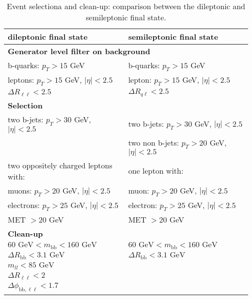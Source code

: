 \documentclass[10pt,a4paper]{article}
\newcommand{\levels}[1]{ \multicolumn{2}{l}{\hspace{-1em}\textbf{#1}}}
\newcommand{\T}{\rule{0pt}{2.9ex}}       %
\newcommand{\lnu}{$\ell\nu$}
\renewcommand{\ll}{\ell\ell}
\newcommand{\bb}{\text{bb}}
\begin{document}
\begin{table}[p]
	\centering
	\caption{Event selectiona and clean-up: comparison between the dileptonic and semileptonic final state.} \vspace{5pt}
	\label{cuts}
	\begin{tabular}{@{\quad}ll@{}}
	\toprule
	dileptonic final state                     &   semileptonic final state   \\
	\midrule
	\levels{Generator level filter on background} \T\\
	b-quarks: $p_T > 15$ GeV                      & b-quarks: $p_T > 15$ GeV    \\
	leptons: $p_T > 15$ GeV, $|\eta| < 2.5$       & lepton: $p_T > 15$ GeV, $|\eta| < 2.5$    \\
	$\Delta R_{\ll} < 2.5$                        & $\Delta R_{q\ell} < 2.5$ \\
	\levels{Selection} \T\\
	two b-jets: $p_T > 30$ GeV, $|\eta|<2.5$      & two b-jets: $p_T > 30$ GeV, $|\eta|<2.5$ \\
	                                              & two non b-jets: $p_T > 20$ GeV, $|\eta|<2.5$ \\
	two oppositely charged leptons with:          & one lepton with: \\
	\quad muons: $p_T > 20$ GeV, $|\eta|<2.5$     & \quad muon: $p_T > 20$ GeV, $|\eta|<2.5$ \\
	\quad electrons: $p_T > 25$ GeV, $|\eta|<2.5$ & \quad electron: $p_T > 25$ GeV, $|\eta|<2.5$ \\
	MET $> 20$ GeV                                & MET $> 20$ GeV \\
	\levels{Clean-up} \T\\
	$60 \text{ GeV} < m_{\bb} < 160 \text{ GeV}$  & $60 \text{ GeV} < m_{\bb} < 160 \text{ GeV}$ \\
	$\Delta R_{\bb} < 3.1 \text{ GeV}$            & $\Delta R_{\bb} < 3.1 \text{ GeV}$ \\
	$m_{ll} < 85 \text{ GeV}$                     & \\
	$\Delta R_{\ll} < 2$                          & \\
	$\Delta \phi_{\text{bb},\ll} < 1.7$           & \\
	
	\end{tabular}
\end{table}
\end{document}
